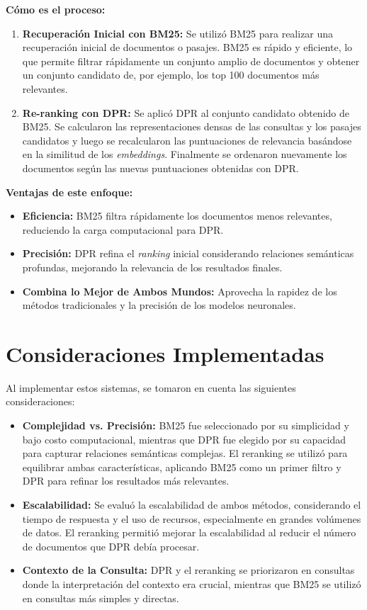 \documentclass[runningheads]{llncs}
\begin{document}
\textbf{Cómo es el proceso:}
\begin{enumerate}
    \item \textbf{Recuperación Inicial con BM25:}
    Se utilizó BM25 para realizar una recuperación inicial de documentos o pasajes. BM25 es rápido y eficiente, lo que permite filtrar rápidamente un conjunto amplio de documentos y obtener un conjunto candidato de, por ejemplo, los top 100 documentos más relevantes.
    
    \item \textbf{Re-ranking con DPR:}
    Se aplicó DPR al conjunto candidato obtenido de BM25. Se calcularon las representaciones densas de las consultas y los pasajes candidatos y luego se recalcularon las puntuaciones de relevancia basándose en la similitud de los \emph{embeddings}. Finalmente se ordenaron nuevamente los documentos según las nuevas puntuaciones obtenidas con DPR.
\end{enumerate}

\textbf{Ventajas de este enfoque:}
\begin{itemize}
    \item \textbf{Eficiencia:} BM25 filtra rápidamente los documentos menos relevantes, reduciendo la carga computacional para DPR.
    \item \textbf{Precisión:} DPR refina el \emph{ranking} inicial considerando relaciones semánticas profundas, mejorando la relevancia de los resultados finales.
    \item \textbf{Combina lo Mejor de Ambos Mundos:} Aprovecha la rapidez de los métodos tradicionales y la precisión de los modelos neuronales.
\end{itemize}

\section{Consideraciones Implementadas}
Al implementar estos sistemas, se tomaron en cuenta las siguientes consideraciones:
\begin{itemize}
    \item \textbf{Complejidad vs. Precisión:} BM25 fue seleccionado por su simplicidad y bajo costo computacional, mientras que DPR fue elegido por su capacidad para capturar relaciones semánticas complejas. El reranking se utilizó para equilibrar ambas características, aplicando BM25 como un primer filtro y DPR para refinar los resultados más relevantes.
    \item \textbf{Escalabilidad:} Se evaluó la escalabilidad de ambos métodos, considerando el tiempo de respuesta y el uso de recursos, especialmente en grandes volúmenes de datos. El reranking permitió mejorar la escalabilidad al reducir el número de documentos que DPR debía procesar.
    \item \textbf{Contexto de la Consulta:} DPR y el reranking se priorizaron en consultas donde la interpretación del contexto era crucial, mientras que BM25 se utilizó en consultas más simples y directas.
\end{itemize}
\end{document}
